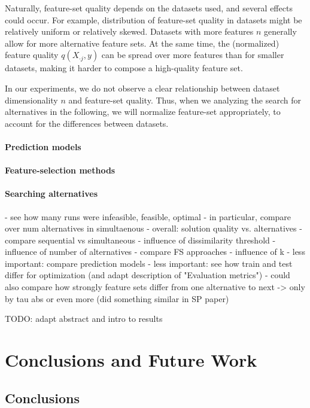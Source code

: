 \documentclass{article}
\theoremstyle{definition}
\begin{document}
Naturally, feature-set quality depends on the datasets used, and several effects could occur.
For example, distribution of feature-set quality in datasets might be relatively uniform or relatively skewed.
Datasets with more features $n$ generally allow for more alternative feature sets.
At the same time, the (normalized) feature quality $q(X_{\cdot{}j},y)$ can be spread over more features than for smaller datasets, making it harder to compose a high-quality feature set.

In our experiments, we do not observe a clear relationship between dataset dimensionality $n$ and feature-set quality.
Thus, when we analyzing the search for alternatives in the following, we will normalize feature-set appropriately, to account for the differences between datasets.

\paragraph{Prediction models}

\paragraph{Feature-selection methods}

\paragraph{Searching alternatives}

- see how many runs were infeasible, feasible, optimal
  - in particular, compare over num alternatives in simultaenous
- overall: solution quality vs. alternatives
- compare sequential vs simultaneous
- influence of dissimilarity threshold
- influence of number of alternatives
- compare FS approaches
- influence of k
- less important: compare prediction models
- less important: see how train and test differ for optimization (and adapt description of "Evaluation metrics")
- could also compare how strongly feature sets differ from one alternative to next -> only by tau abs or even more (did something similar in SP paper)

TODO: adapt abstract and intro to results

\section{Conclusions and Future Work}
\label{sec:conclusion}

\subsection{Conclusions}
\end{document}
